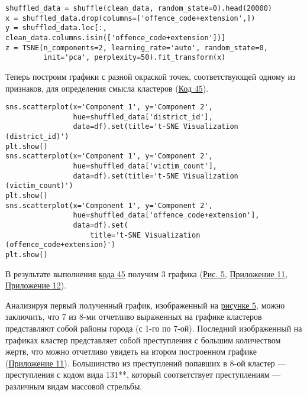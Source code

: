 \begin{code}
\begin{verbatim}
shuffled_data = shuffle(clean_data, random_state=0).head(20000)
x = shuffled_data.drop(columns=['offence_code+extension',])
y = shuffled_data.loc[:, clean_data.columns.isin(['offence_code+extension'])]
z = TSNE(n_components=2, learning_rate='auto', random_state=0,
         init='pca', perplexity=50).fit_transform(x)
\end{verbatim}
\label{code:44}
\end{code}

Теперь построим графики с разной окраской точек, соответствующей одному из признаков, для определения смысла кластеров (\hyperref[code:45]{Код 45}).

\begin{code}
\begin{verbatim}
sns.scatterplot(x='Component 1', y='Component 2',
                hue=shuffled_data['district_id'],
                data=df).set(title='t-SNE Visualization (district_id)')
plt.show()
sns.scatterplot(x='Component 1', y='Component 2',
                hue=shuffled_data['victim_count'],
                data=df).set(title='t-SNE Visualization (victim_count)')
plt.show()
sns.scatterplot(x='Component 1', y='Component 2',
                hue=shuffled_data['offence_code+extension'],
                data=df).set(
                    title='t-SNE Visualization (offence_code+extension)')
plt.show()
\end{verbatim}
\label{code:45}
\end{code}

В результате выполнения \hyperref[code:45]{кода 45} получим 3 графика (\hyperref[image:5]{Рис. 5}, \hyperref[appendix:11]{Приложение 11}, \hyperref[appendix:12]{Приложение 12}).

\label{image:5}

Анализируя первый полученный график, изображенный на \hyperref[image:5]{рисунке 5}, можно заключить, что 7 из 8-ми отчетливо выраженных на графике кластеров представляют собой районы города (с 1-го по 7-ой). Последний изображенный на графиках кластер представляет собой преступления с большим количеством жертв, что можно отчетливо увидеть на втором построенном графике (\hyperref[appendix:11]{Приложение 11}). Большинство из преступлений попавших в 8-ой кластер --- преступления с кодом вида 131**, который соответствует преступлениям --- различным видам массовой стрельбы.

